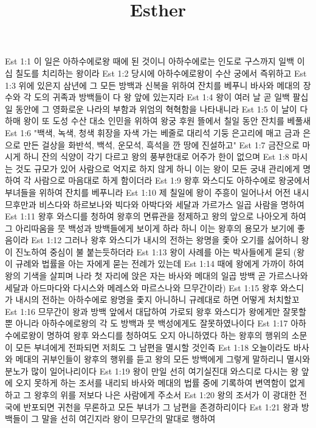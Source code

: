 

\title{Esther}

Est 1:1  이 일은 아하수에로왕 때에 된 것이니 아하수에로는 인도로 구스까지 일백 이십 칠도를 치리하는 왕이라
Est 1:2  당시에 아하수에로왕이 수산 궁에서 즉위하고
Est 1:3  위에 있은지 삼년에 그 모든 방백과 신복을 위하여 잔치를 베푸니 바사와 메대의 장수와 각 도의 귀족과 방백들이 다 왕 앞에 있는지라
Est 1:4  왕이 여러 날 곧 일백 팔십일 동안에 그 영화로운 나라의 부함과 위엄의 혁혁함을 나타내니라
Est 1:5  이 날이 다하매 왕이 또 도성 수산 대소 인민을 위하여 왕궁 후원 뜰에서 칠일 동안 잔치를 베풀새
Est 1:6  "백색, 녹색, 청색 휘장을 자색 가는 베줄로 대리석 기둥 은고리에 매고 금과 은으로 만든 걸상을 화반석, 백석, 운모석, 흑석을 깐 땅에 진설하고"
Est 1:7  금잔으로 마시게 하니 잔의 식양이 각기 다르고 왕의 풍부한대로 어주가 한이 없으며
Est 1:8  마시는 것도 규모가 있어 사람으로 억지로 하지 않게 하니 이는 왕이 모든 궁내 관리에게 명하여 각 사람으로 마음대로 하게 함이더라
Est 1:9  왕후 와스디도 아하수에로 왕궁에서 부녀들을 위하여 잔치를 베푸니라
Est 1:10  제 칠일에 왕이 주흥이 일어나서 어전 내시 므후만과 비스다와 하르보나와 빅다와 아박다와 세달과 가르가스 일곱 사람을 명하여
Est 1:11  왕후 와스디를 청하여 왕후의 면류관을 정제하고 왕의 앞으로 나아오게 하여 그 아리따움을 뭇 백성과 방백들에게 보이게 하라 하니 이는 왕후의 용모가 보기에 좋음이라
Est 1:12  그러나 왕후 와스디가 내시의 전하는 왕명을 좇아 오기를 싫어하니 왕이 진노하여 중심이 불 붙는듯하더라
Est 1:13  왕이 사례를 아는 박사들에게 묻되 (왕이 규례와 법률을 아는 자에게 묻는 전례가 있는데
Est 1:14  때에 왕에게 가까이 하여 왕의 기색을 살피며 나라 첫 자리에 앉은 자는 바사와 메대의 일곱 방백 곧 가르스나와 세달과 아드마다와 다시스와 메레스와 마르스나와 므무간이라)
Est 1:15  왕후 와스디가 내시의 전하는 아하수에로 왕명을 좇지 아니하니 규례대로 하면 어떻게 처치할꼬
Est 1:16  므무간이 왕과 방백 앞에서 대답하여 가로되 왕후 와스디가 왕에게만 잘못할뿐 아니라 아하수에로왕의 각 도 방백과 뭇 백성에게도 잘못하였나이다
Est 1:17  아하수에로왕이 명하여 왕후 와스디를 청하여도 오지 아니하였다 하는 왕후의 행위의 소문이 모든 부녀에게 전파되면 저희도 그 남편을 멸시할 것인즉
Est 1:18  오늘이라도 바사와 메대의 귀부인들이 왕후의 행위를 듣고 왕의 모든 방백에게 그렇게 말하리니 멸시와 분노가 많이 일어나리이다
Est 1:19  왕이 만일 선히 여기실진대 와스디로 다시는 왕 앞에 오지 못하게 하는 조서를 내리되 바사와 메대의 법률 중에 기록하여 변역함이 없게 하고 그 왕후의 위를 저보다 나은 사람에게 주소서
Est 1:20  왕의 조서가 이 광대한 전국에 반포되면 귀천을 무론하고 모든 부녀가 그 남편을 존경하리이다
Est 1:21  왕과 방백들이 그 말을 선히 여긴지라 왕이 므무간의 말대로 행하여
